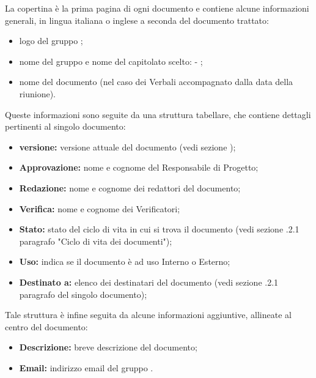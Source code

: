        La copertina è la prima pagina di ogni documento e contiene alcune informazioni generali, in lingua italiana o inglese a seconda del documento trattato:
        \begin{itemize}
          \item logo del gruppo \Gruppo{};
          \item nome del gruppo e nome del capitolato scelto: \Gruppo{} - \NomeProgetto{};
          \item nome del documento (nel caso dei Verbali accompagnato dalla data della riunione).
        \end{itemize}
        Queste informazioni sono seguite da una struttura tabellare, che contiene dettagli pertinenti al singolo documento:
        \begin{itemize}
          \item \textbf{versione:} versione attuale del documento (vedi sezione );%
          \item \textbf{Approvazione:} nome e cognome del Responsabile di Progetto;
          \item \textbf{Redazione:} nome e cognome dei redattori del documento;
          \item \textbf{Verifica:} nome e cognome dei Verificatori;
          \item \textbf{Stato:} stato del ciclo di vita in cui si trova il documento (vedi sezione .2.1 paragrafo "Ciclo di vita dei documenti");
          \item \textbf{Uso:} indica se il documento è ad uso Interno o Esterno;
          \item \textbf{Destinato a:} elenco dei destinatari del documento (vedi sezione .2.1 paragrafo del singolo documento);
    	\end{itemize}
    	Tale struttura è infine seguita da alcune informazioni aggiuntive, allineate al centro del documento:
    	\begin{itemize}
          \item \textbf{Descrizione:} breve descrizione del documento;
          \item \textbf{Email:} indirizzo email del gruppo \Gruppo{}.
   		\end{itemize}


